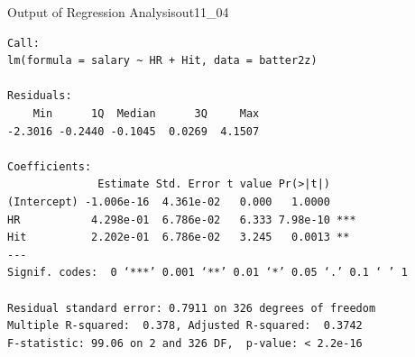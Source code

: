\begin{Rscreen}{Output of Regression Analysis}{out11_04}
	\begin{verbatim}
Call:
lm(formula = salary ~ HR + Hit, data = batter2z)

Residuals:
    Min      1Q  Median      3Q     Max 
-2.3016 -0.2440 -0.1045  0.0269  4.1507 

Coefficients:
              Estimate Std. Error t value Pr(>|t|)    
(Intercept) -1.006e-16  4.361e-02   0.000   1.0000    
HR           4.298e-01  6.786e-02   6.333 7.98e-10 ***
Hit          2.202e-01  6.786e-02   3.245   0.0013 ** 
---
Signif. codes:  0 ‘***’ 0.001 ‘**’ 0.01 ‘*’ 0.05 ‘.’ 0.1 ‘ ’ 1

Residual standard error: 0.7911 on 326 degrees of freedom
Multiple R-squared:  0.378,	Adjusted R-squared:  0.3742 
F-statistic: 99.06 on 2 and 326 DF,  p-value: < 2.2e-16
\end{verbatim}
\end{Rscreen}
